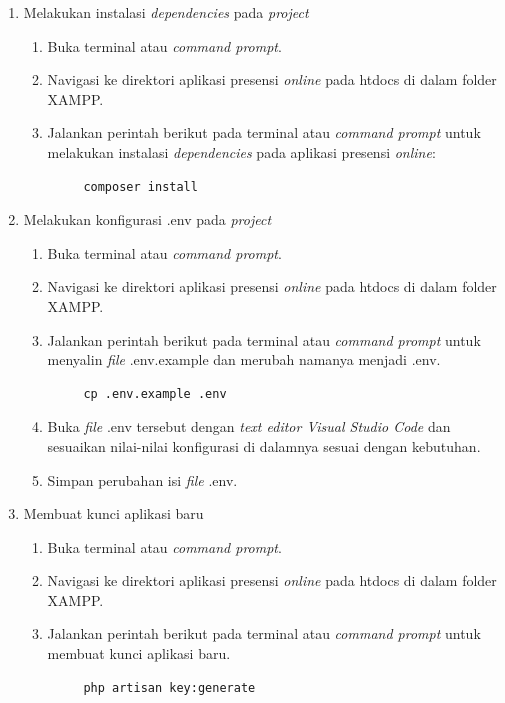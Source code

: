 \begin{enumerate}
    \item Melakukan instalasi \textit{dependencies} pada \textit{project}
    \begin{enumerate}
        \item Buka terminal atau \textit{command prompt}.
        \item Navigasi ke direktori aplikasi presensi \textit{online} pada htdocs di dalam folder XAMPP.
         \item Jalankan perintah berikut pada terminal atau \textit{command prompt} untuk melakukan instalasi \textit{dependencies} pada aplikasi presensi \textit{online}:
         {\small\begin{verbatim}     composer install
\end{verbatim}}
    \end{enumerate}

    \item Melakukan konfigurasi .env pada \textit{project}
    \begin{enumerate}
        \item Buka terminal atau \textit{command prompt}.
        \item Navigasi ke direktori aplikasi presensi \textit{online} pada htdocs di dalam folder XAMPP.
        \item Jalankan perintah berikut pada terminal atau \textit{command prompt} untuk menyalin \textit{file} .env.example dan merubah namanya menjadi .env.
         {\small\begin{verbatim}     cp .env.example .env
\end{verbatim}}
        \item Buka \textit{file} .env tersebut dengan \textit{text editor Visual Studio Code} dan sesuaikan nilai-nilai konfigurasi di dalamnya sesuai dengan kebutuhan. 
        \item Simpan perubahan isi \textit{file} .env.
    \end{enumerate}

    \item Membuat kunci aplikasi baru
    \begin{enumerate}
        \item Buka terminal atau \textit{command prompt}.
        \item Navigasi ke direktori aplikasi presensi \textit{online} pada htdocs di dalam folder XAMPP.
        \item Jalankan perintah berikut pada terminal atau \textit{command prompt} untuk membuat kunci aplikasi baru.
         {\small\begin{verbatim}     php artisan key:generate
\end{verbatim}}
    \end{enumerate}


\end{enumerate}
